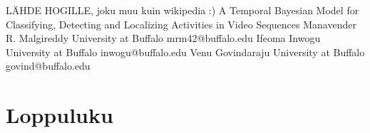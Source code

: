 LÄHDE HOGILLE, joku muu kuin wikipedia :)
A Temporal Bayesian Model for Classifying, Detecting and Localizing Activities
in Video Sequences
Manavender R. Malgireddy
University at Buffalo
mrm42@buffalo.edu
Ifeoma Inwogu
University at Buffalo
inwogu@buffalo.edu
Venu Govindaraju
University at Buffalo
govind@buffalo.edu

\section{Loppuluku}




